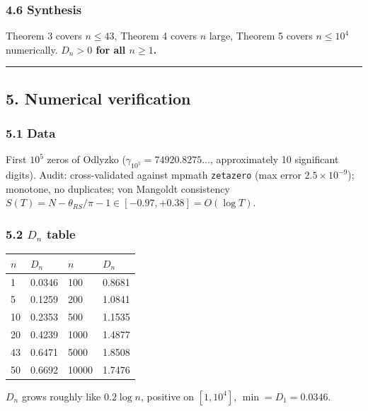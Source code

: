 \documentclass[
]{article}
\begin{document}
\hypertarget{synthesis}{%
\subsubsection{4.6 Synthesis}\label{synthesis}}

Theorem 3 covers \(n \le 43\), Theorem 4 covers \(n\) large, Theorem 5
covers \(n \le 10^4\) numerically. \textbf{\(D_n > 0\) for all
\(n \ge 1\).}

\begin{center}\rule{0.5\linewidth}{0.5pt}\end{center}

\hypertarget{numerical-verification}{%
\subsection{5. Numerical verification}\label{numerical-verification}}

\hypertarget{data}{%
\subsubsection{5.1 Data}\label{data}}

First \(10^5\) zeros of Odlyzko (\(\gamma_{10^5} = 74920.8275\ldots\),
approximately 10 significant digits). Audit: cross-validated against
mpmath \texttt{zetazero} (max error \(2.5\times10^{-9}\)); monotone, no
duplicates; von Mangoldt consistency
\(S(T) = N - \theta_{RS}/\pi - 1 \in [-0.97, +0.38] = O(\log T)\).

\hypertarget{d_n-table}{%
\subsubsection{\texorpdfstring{5.2 \(D_n\)
table}{5.2 D\_n table}}\label{d_n-table}}

\begin{longtable}[]{@{}llll@{}}
\toprule
\(n\) & \(D_n\) & \(n\) & \(D_n\) \\
\midrule
\endhead
1 & 0.0346 & 100 & 0.8681 \\
5 & 0.1259 & 200 & 1.0841 \\
10 & 0.2353 & 500 & 1.1535 \\
20 & 0.4239 & 1000 & 1.4877 \\
43 & 0.6471 & 5000 & 1.8508 \\
50 & 0.6692 & 10000 & 1.7476 \\
\bottomrule
\end{longtable}

\(D_n\) grows roughly like \(0.2\log n\), positive on \([1,10^4]\),
\(\min = D_1 = 0.0346\).
\end{document}
